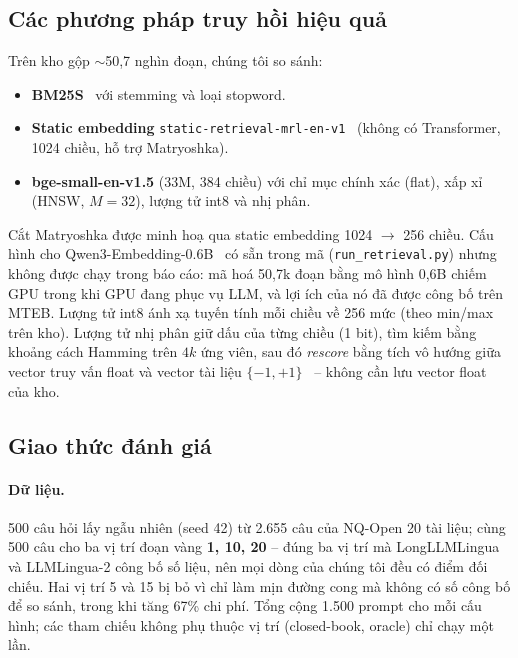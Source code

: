 \subsection{Các phương pháp truy hồi hiệu quả}

Trên kho gộp $\sim$50,7 nghìn đoạn, chúng tôi so sánh:
\begin{itemize}
  \item \textbf{BM25S}~\cite{lu2024bm25s} với stemming và loại stopword.
  \item \textbf{Static embedding} \texttt{static-retrieval-mrl-en-v1}~\cite{hfstatic2025} (không có
  Transformer, 1024 chiều, hỗ trợ Matryoshka).
  \item \textbf{bge-small-en-v1.5} (33M, 384 chiều) với chỉ mục chính xác (flat), xấp xỉ (HNSW, $M=32$),
  lượng tử int8 và nhị phân.
\end{itemize}
Cắt Matryoshka được minh hoạ qua static embedding 1024 $\to$ 256 chiều. Cấu hình cho
Qwen3-Embedding-0.6B~\cite{zhang2025qwen3emb} có sẵn trong mã (\texttt{run\_retrieval.py}) nhưng
không được chạy trong báo cáo: mã hoá 50,7k đoạn bằng mô hình 0,6B chiếm GPU trong khi GPU đang phục vụ
LLM, và lợi ích của nó đã được công bố trên MTEB.
Lượng tử int8 ánh xạ tuyến tính mỗi chiều về 256 mức (theo min/max trên kho). Lượng tử nhị phân giữ
dấu của từng chiều (1 bit), tìm kiếm bằng khoảng cách Hamming trên $4k$ ứng viên, sau đó \emph{rescore}
bằng tích vô hướng giữa vector truy vấn float và vector tài liệu $\{-1,+1\}$~\cite{hfquant2024} -- không
cần lưu vector float của kho.

\subsection{Giao thức đánh giá}
\label{sec:protocol}

\paragraph{Dữ liệu.} 500 câu hỏi lấy ngẫu nhiên (seed 42) từ 2.655 câu của NQ-Open 20 tài liệu; cùng
500 câu cho ba vị trí đoạn vàng \textbf{1, 10, 20} -- đúng ba vị trí mà LongLLMLingua và LLMLingua-2
công bố số liệu, nên mọi dòng của chúng tôi đều có điểm đối chiếu. Hai vị trí 5 và 15 bị bỏ vì chỉ làm
mịn đường cong mà không có số công bố để so sánh, trong khi tăng 67\% chi phí. Tổng cộng 1.500 prompt
cho mỗi cấu hình; các tham chiếu không phụ thuộc vị trí (closed-book, oracle) chỉ chạy một lần.

